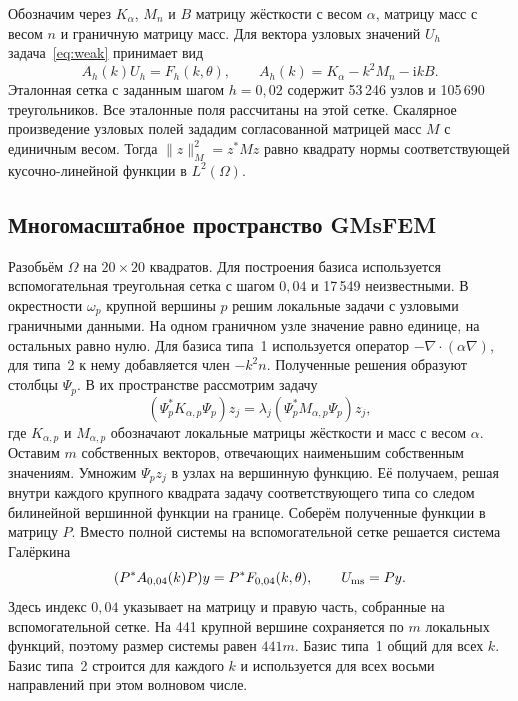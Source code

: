 \documentclass[11pt,a4paper]{article}
\newcommand{\ii}{\mathrm{i}}
\newcommand{\norm}[1]{\lVert #1\rVert}
\begin{document}
Обозначим через $K_\alpha$, $M_n$ и $B$ матрицу жёсткости с весом $\alpha$, матрицу масс с весом $n$ и граничную матрицу масс. Для вектора узловых значений $U_h$ задача~\eqref{eq:weak} принимает вид
\begin{equation}
 A_h(k)U_h=F_h(k,\theta),\qquad A_h(k)=K_\alpha-k^2M_n-\ii kB.
 \label{eq:algebra}
\end{equation}
Эталонная сетка с заданным шагом $h=0{,}02$ содержит 53\,246 узлов и 105\,690 треугольников. Все эталонные поля рассчитаны на этой сетке. Скалярное произведение узловых полей зададим согласованной матрицей масс $M$ с единичным весом. Тогда $\norm{z}_M^2=z^*Mz$ равно квадрату нормы соответствующей кусочно-линейной функции в $L^2(\Omega)$.

\subsection*{Многомасштабное пространство GMsFEM}
Разобьём $\Omega$ на $20\times20$ квадратов. Для построения базиса используется вспомогательная треугольная сетка с шагом $0{,}04$ и 17\,549 неизвестными. В окрестности $\omega_p$ крупной вершины $p$ решим локальные задачи с узловыми граничными данными. На одном граничном узле значение равно единице, на остальных равно нулю. Для базиса типа~1 используется оператор $-\nabla\!\cdot(\alpha\nabla)$, для типа~2 к нему добавляется член $-k^2n$. Полученные решения образуют столбцы $\Psi_p$. В их пространстве рассмотрим задачу
\begin{equation}
  (\Psi_p^*K_{\alpha,p}\Psi_p)z_j
   =\lambda_j(\Psi_p^*M_{\alpha,p}\Psi_p)z_j ,
 \label{eq:local}
\end{equation}
где $K_{\alpha,p}$ и $M_{\alpha,p}$ обозначают локальные матрицы жёсткости и масс с весом $\alpha$. Оставим $m$ собственных векторов, отвечающих наименьшим собственным значениям. Умножим $\Psi_pz_j$ в узлах на вершинную функцию. Её получаем, решая внутри каждого крупного квадрата задачу соответствующего типа со следом билинейной вершинной функции на границе. Соберём полученные функции в матрицу $P$. Вместо полной системы на вспомогательной сетке решается система Галёркина
\[
  (P^* A_{0{,}04}(k)P)y=P^*F_{0{,}04}(k,\theta),\qquad U_{\rm ms}=Py .
\]
Здесь индекс $0{,}04$ указывает на матрицу и правую часть, собранные на вспомогательной сетке. На 441 крупной вершине сохраняется по $m$ локальных функций, поэтому размер системы равен $441m$. Базис типа~1 общий для всех $k$. Базис типа~2 строится для каждого $k$ и используется для всех восьми направлений при этом волновом числе.
\end{document}

